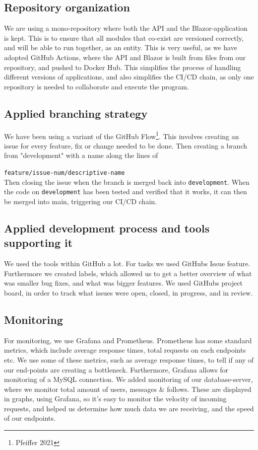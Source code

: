 \documentclass{article}
\begin{document}
\subsection{Repository organization}
We are using a mono-repository where both the API and the Blazor-application is kept. This is to ensure that all modules that co-exist are versioned correctly, and will be able to run together, as an entity. This is very useful, as we have adopted GitHub Actions, where the API and Blazor is built from files from our repository, and pushed to Docker Hub. This simplifies the process of handling different versions of applications, and also simplifies the CI/CD chain, as only one repository is needed to collaborate and execute the program.

\subsection{Applied branching strategy}
We have been using a variant of the GitHub Flow\footnote{Pfeiffer 2021}. This involves creating an issue for every feature, fix or change needed to be done. Then creating a branch from "development" with a name along the lines of

\verb|feature/issue-num/descriptive-name|
\\
Then closing the issue when the branch is merged back into \verb|development|.
\newline \newline
When the code on \verb|development| has been tested and verified that it works, it can then be merged into main, triggering our CI/CD chain.

\subsection{Applied development process and tools supporting it}
We used the tools within GitHub a lot. For tasks we used GitHubs Issue feature. Furthermore we created labels, which allowed us to get a better overview of what was smaller bug fixes, and what was bigger features. We used GitHubs project board, in order to track what issues were open, closed, in progress, and in review.

\subsection{Monitoring}
For monitoring, we use Grafana and Prometheus. Prometheus has some standard metrics, which include average response times, total requests on each endpoints etc. We use some of these metrics, such as average response times, to tell if any of our end-points are creating a bottleneck. Furthermore, Grafana allows for monitoring of a MySQL connection. We added monitoring of our database-server, where we monitor total amount of users, messages \& follows. These are displayed in graphs, using Grafana, so it's easy to monitor the velocity of incoming requests, and helped us determine how much data we are receiving, and the speed of our endpoints.
\end{document}
